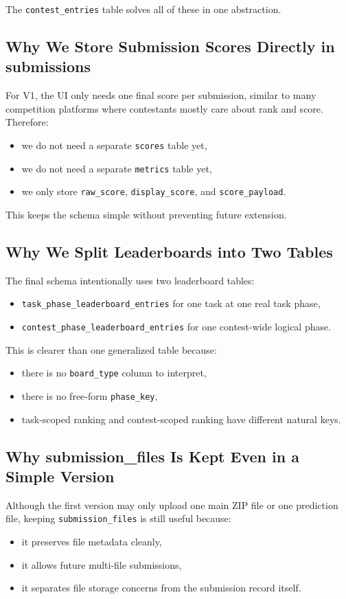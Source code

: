 \documentclass[11pt,a4paper]{article}
\begin{document}
The \texttt{contest\_entries} table solves all of these in one abstraction.

\subsection{Why We Store Submission Scores Directly in submissions}
For V1, the UI only needs one final score per submission, similar to many competition platforms where contestants mostly care about rank and score. Therefore:
\begin{itemize}
    \item we do not need a separate \texttt{scores} table yet,
    \item we do not need a separate \texttt{metrics} table yet,
    \item we only store \texttt{raw\_score}, \texttt{display\_score}, and \texttt{score\_payload}.
\end{itemize}

This keeps the schema simple without preventing future extension.

\subsection{Why We Split Leaderboards into Two Tables}
The final schema intentionally uses two leaderboard tables:
\begin{itemize}
    \item \texttt{task\_phase\_leaderboard\_entries} for one task at one real task phase,
    \item \texttt{contest\_phase\_leaderboard\_entries} for one contest-wide logical phase.
\end{itemize}

This is clearer than one generalized table because:
\begin{itemize}
    \item there is no \texttt{board\_type} column to interpret,
    \item there is no free-form \texttt{phase\_key},
    \item task-scoped ranking and contest-scoped ranking have different natural keys.
\end{itemize}

\subsection{Why submission\_files Is Kept Even in a Simple Version}
Although the first version may only upload one main ZIP file or one prediction file, keeping \texttt{submission\_files} is still useful because:
\begin{itemize}
    \item it preserves file metadata cleanly,
    \item it allows future multi-file submissions,
    \item it separates file storage concerns from the submission record itself.
\end{itemize}
\end{document}
